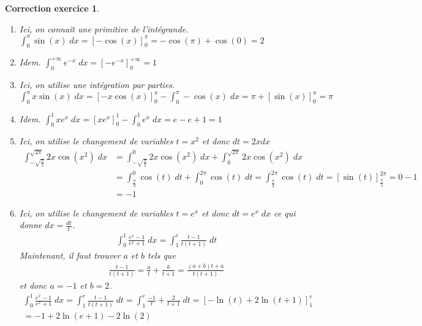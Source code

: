 \documentclass[12pt]{article}
\newtheorem{correction}{\bf Correction exercice}
\newenvironment{cor}{
\begin{correction}\smallskip\normalfont}{\end{correction}
}
\newif\ifcorrige\corrigetrue
\begin{document}
\ifcorrige
\color{magenta}
\begin{cor}
$\qquad$
\begin{enumerate}
\item Ici, on conna\^it une primitive de l'int\'egrande.
  $\int_0^{\pi} \sin(x) \;dx = [-\cos(x)]_0^{\pi} = -\cos(\pi) + \cos(0) = 2$
\item Idem. $\int_0^{+\infty} e^{-x} \;dx = [-e^{-x}]_0^{+\infty} = 1$
\item Ici, on utilise une int\'egration par parties.
  $\int_0^{\pi} x \sin(x) \;dx = [-x \cos(x)]_0^{\pi} - \int_0^{\pi} - \cos(x) \;dx
  = \pi + [\sin(x)]_0^{\pi} = \pi$
\item Idem.
  $\int_0^1 x e^x \;dx = [xe^x]_0^1 - \int_0^1 e^x \;dx
  = e - e + 1 = 1$

\item Ici, on utilise le changement de variables
  $t = x^2$ et donc $dt = 2x dx$
  \begin{align*}
    \int_{- \sqrt{\frac{\pi}{2}}}^{\sqrt{2\pi}} 2x \cos(x^2) \;dx
    &= \int_{- \sqrt{\frac{\pi}{2}}}^0 2x \cos(x^2) \;dx
    + \int_0^{\sqrt{2\pi}} 2x \cos(x^2) \;dx
    \\
    &= \int_{\frac{\pi}{2}}^0 \cos(t) \;dt
    + \int_0^{2\pi} \cos(t) \;dt
    = \int_{\frac{\pi}{2}}^{2\pi} \cos(t) \;dt
    = [\sin(t)]_{\frac{\pi}{2}}^{2\pi}
    = 0 - 1
    \\
    &= -1
  \end{align*}

\item
  Ici, on utilise le changement de variables
  $t = e^x$ et donc $dt = e^x \;dx$ ce qui donne $dx = \frac{dt}{t}$.
  \begin{align*}
    \int_{0}^1 \frac{e^x - 1}{e^x + 1} \;dx
    = \int_{1}^e \frac{t - 1}{t(t + 1)} \;dt
  \end{align*}
  Maintenant, il faut trouver $a$ et $b$ tels que
  \begin{align*}
    \frac{t - 1}{t(t + 1)}
    =
    \frac{a}{t} + \frac{b}{t+1}
    =
    \frac{(a+b)t+a}{t(t+1)}
  \end{align*}
  et donc $a=-1$ et $b=2$.
  \begin{align*}
    \int_{0}^1 \frac{e^x - 1}{e^x + 1} \;dx
    = \int_{1}^e \frac{t - 1}{t(t + 1)} \;dt
    = \int_{1}^e \frac{- 1}{t} + \frac{2}{t+1} \;dt
    = [-\ln(t) + 2 \ln(t+1)]_1^e
    \\
    = -1 + 2 \ln(e+1) - 2 \ln(2)
  \end{align*}
\end{enumerate}
\end{cor}
\color{black}
\fi

\end{document}
